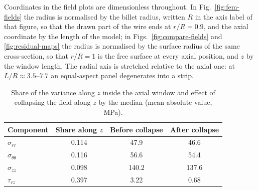 Coordinates in the field plots are dimensionless throughout. In Fig.~\ref{fig:fem-fields} the radius is normalised by the billet radius, written $R$ in the axis label of that figure, so that the drawn part of the wire ends at $r/R = 0.9$, and the axial coordinate by the length of the model; %
in Figs.~\ref{fig:compare-fields} and \ref{fig:residual-maps} the radius is normalised by the surface radius of the same cross-section, so that $r/R = 1$ is the free surface at every axial position, and $z$ by the window length. %
The radial axis is stretched relative to the axial one: at $L/R \approx 3.5$--$7.7$ an equal-aspect panel degenerates into a strip. %

\begin{table}[htbp]
\centering\small
\caption{Share of the variance along $z$ inside the axial window and effect of collapsing the field along $z$ by the median (mean absolute value, MPa).} %
\label{tab:zshare}
\begin{tabular}{@{}lccc@{}}
\toprule
Component & Share along $z$ & Before collapse & After collapse \\
\midrule
$\sigma_{rr}$           & 0.114 & 47.9  & 46.6  \\ %
$\sigma_{\theta\theta}$ & 0.116 & 56.6  & 54.4  \\ %
$\sigma_{zz}$           & 0.098 & 140.2 & 137.6 \\ %
$\tau_{rz}$             & 0.397 & 3.22  & 0.68  \\ %
\bottomrule
\end{tabular}
\end{table}

